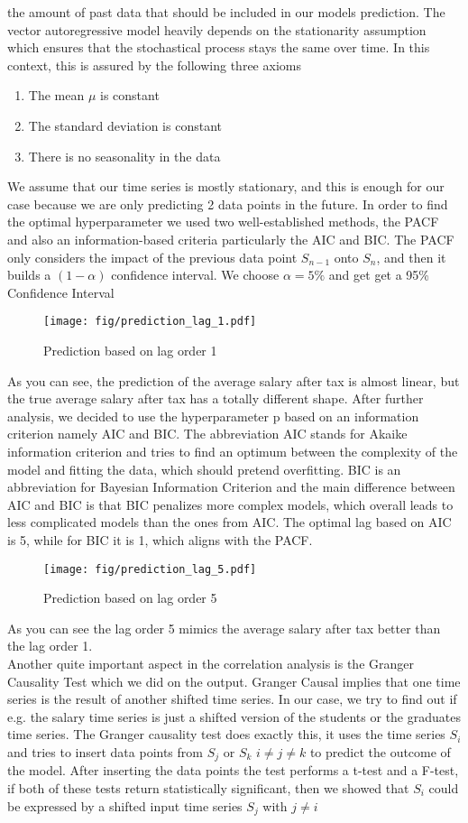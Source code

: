 \documentclass{article}
\theoremstyle{plain}
\theoremstyle{definition}
\theoremstyle{remark}
\begin{document}
the amount of past data that should be included in our models prediction. 
The vector autoregressive model heavily depends on the stationarity assumption which ensures that the stochastical process stays the same over time. 
In this context, this is assured by the following three axioms
\begin{enumerate}[label=\Roman*]
    \item The mean $\mu$ is constant
    \item The standard deviation is constant
    \item There is no seasonality in the data
\end{enumerate}
We assume that our time series is mostly stationary, and this is enough for our case because we are only predicting 2 data points in the future.
In order to find the optimal hyperparameter we used two well-established methods, the PACF and also an information-based criteria particularly the AIC and 
BIC. The PACF only considers the impact of the previous data point $S_{n-1}$ onto $S_{n}$, and then it builds a $(1-\alpha)$ confidence interval. We choose $\alpha = 5\%$ and get
get a 95\% Confidence Interval 
\begin{figure*}
    \texttt{[image: fig/prediction\_lag\_1.pdf]}
    \caption{Prediction based on lag order 1}
\end{figure*}
As you can see, the prediction of the average salary after tax is almost linear, but the true average salary after tax has a totally different shape. After further analysis, we decided to use the hyperparameter p based
on an information criterion namely AIC and BIC. The abbreviation AIC stands for Akaike information criterion and tries to find an optimum between the complexity of the model and fitting the data, which should pretend overfitting. 
BIC is an abbreviation for Bayesian Information Criterion and the main difference between AIC and BIC is that BIC penalizes more complex models, which overall leads to less complicated models than the ones from AIC.
The optimal lag based on AIC is 5, while for BIC it is 1, which aligns with the PACF.
\begin{figure*}
    \texttt{[image: fig/prediction\_lag\_5.pdf]}
    \caption{Prediction based on lag order 5}
\end{figure*}
As you can see the lag order 5 mimics the average salary after tax better than the lag order 1.\\
Another quite important aspect in the correlation analysis is the Granger Causality Test which we did on the output. 
Granger Causal implies that one time series is the result of another shifted time series.
In our case, we try to find out if e.g. the salary time series is just a shifted version of the students or the graduates time series.
The Granger causality test does exactly this, it uses the time series $S_i$ and tries to insert data points from $S_j$ or $S_k$ $i \neq j\neq k$
to predict the outcome of the model. After inserting the data points the test performs a t-test and a F-test, if both of these tests return statistically significant,
then we showed that $S_i$ could be expressed by a shifted input time series $S_j$ with $j\neq i$
\end{document}
